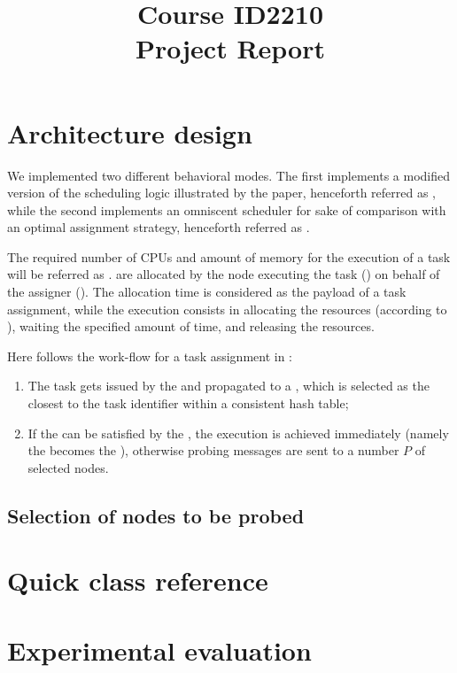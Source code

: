 \documentclass[conference]{IEEEtran}
\title{
  Course ID2210\\
  Project Report
}
\author{
  \IEEEauthorblockN{Riccardo Reale}
  \IEEEauthorblockA{Peerialism AB\\
    {riccardo.reale@peerialism.com}\\
    \url{https://github.com/riccardoreale/id2210-vt14.git}
  }
  \and
  \IEEEauthorblockN{Giovanni Simoni}
  \IEEEauthorblockA{Peerialism AB\\
    {giovanni.simoni@peerialism.com}\\
    \url{https://github.com/dacav/id2210-vt14.git}
  }
}
\begin{document}
\maketitle

\section{Architecture design}

  We implemented two different behavioral modes. The first implements a
  modified version of the scheduling logic illustrated by the paper,
  henceforth referred as \us, while the second implements
  an omniscent scheduler for sake of comparison with an optimal assignment
  strategy, henceforth referred as \omni.

  The required number of CPUs and amount of memory for the execution of a
  task will be referred as \treq. \Treq are allocated by the node executing the
  task (\exc) on behalf of the assigner (\tmast). The allocation time is
  considered as the payload of a task assignment, while the execution
  consists in allocating the resources (according to \treq), waiting the
  specified amount of time, and releasing the resources.

  Here follows the work-flow for a task assignment in \us:
  \begin{enumerate}

  \item The task gets issued by the \dc and propagated
        to a \tmast, which is selected as the closest to the task
        identifier within a consistent hash table;

  \item If the \treq can be satisfied by the \tmast, the execution is
        achieved immediately (namely the \tmast becomes the \exc),
        otherwise probing messages are sent to a number $P$ of selected
        nodes.

  \end{enumerate}

  \subsection{Selection of nodes to be probed}

\section{Quick class reference}

\section{Experimental evaluation}
\end{document}
